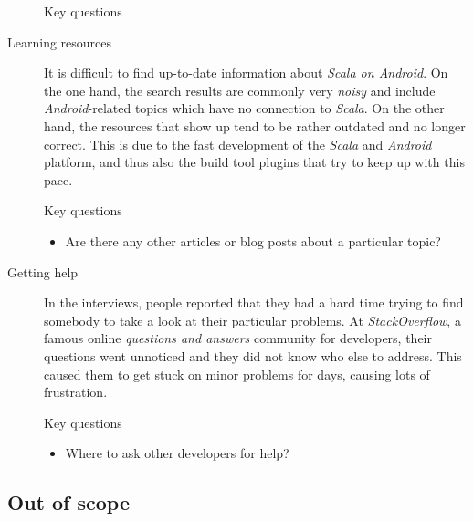 \begin{description}
\begin{highlight}{Key questions}
\begin{itemize}
		\end{itemize}

	\end{highlight}

	\item[Learning resources]\hfill

	It is difficult to find up-to-date information about \textit{Scala on Android}. On the one hand, the search results are commonly very \textit{noisy} and include \textit{Android}-related topics which have no connection to \textit{Scala}. On the other hand, the resources that show up tend to be rather outdated and no longer correct. This is due to the fast development of the \textit{Scala} and \textit{Android} platform, and thus also the build tool plugins that try to keep up with this pace.

	\begin{highlight}{Key questions}

		\begin{itemize}

			\item Are there any other articles or blog posts about a particular topic?

		\end{itemize}

	\end{highlight}

	\item[Getting help]\hfill

	In the interviews, people reported that they had a hard time trying to find somebody to take a look at their particular problems. At \textit{StackOverflow}, a famous online \textit{questions and answers} community for developers, their questions went unnoticed and they did not know who else to address. This caused them to get stuck on minor problems for days, causing lots of frustration.

	\begin{highlight}{Key questions}

		\begin{itemize}

			\item Where to ask other developers for help?

		\end{itemize}

	\end{highlight}

\end{description}

\subsection{Out of scope}

